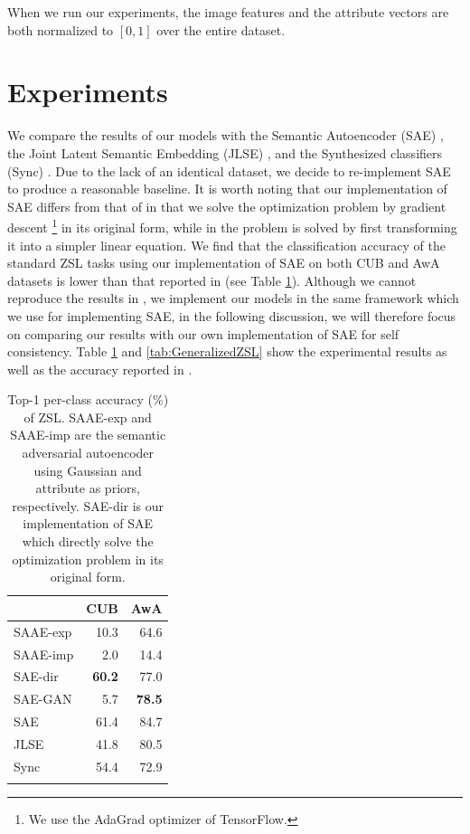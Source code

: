 \documentclass{article}
\begin{document}
When we run our experiments, the image features and the attribute vectors are both normalized to $[0, 1]$ over the entire dataset.




\section{Experiments}

We compare the results of our models with the Semantic Autoencoder (SAE) \cite{kodirov2017semantic}, the Joint Latent Semantic Embedding (JLSE) \cite{zhang2016zero}, and the Synthesized classifiers (Sync) \cite{changpinyo2016synthesized}. Due to the lack of an identical dataset, we decide to re-implement SAE to produce a reasonable baseline. It is worth noting that our implementation of SAE differs from that of \cite{kodirov2017semantic} in that we solve the optimization problem by gradient descent%
\footnote{We use the AdaGrad optimizer of TensorFlow.}%
in its original form, while in \cite{kodirov2017semantic} the problem is solved by first transforming it into a simpler linear equation. We find that the classification accuracy of the standard ZSL tasks using our implementation of SAE on both CUB and AwA datasets is lower than that reported in \cite{kodirov2017semantic} (see Table \ref{tab:StandardZSL}). Although we cannot reproduce the results in \cite{kodirov2017semantic}, we implement our models in the same framework which we use for implementing SAE, in the following discussion, we will therefore focus on comparing our results with our own implementation of SAE for self consistency. Table \ref{tab:StandardZSL} and \ref{tab:GeneralizedZSL} show the experimental results as well as the accuracy reported in \cite{kodirov2017semantic}.



\begin{table}[!htb]
\centering
\begin{tabular}{lrr}
\toprule
 & CUB & AwA \\
\midrule
SAAE-exp & 10.3 & 64.6 \\
SAAE-imp & 2.0 & 14.4 \\
SAE-dir & \bf{60.2} & 77.0 \\
SAE-GAN & 5.7 & \bf{78.5} \\
\midrule
SAE \cite{kodirov2017semantic} & 61.4 & 84.7 \\
JLSE \cite{zhang2016zero} & 41.8 & 80.5 \\
Sync \cite{changpinyo2016synthesized} & 54.4 & 72.9 \\
\bottomrule \\
\end{tabular}
\caption{Top-1 per-class accuracy (\%) of ZSL. SAAE-exp and SAAE-imp are the semantic adversarial autoencoder using Gaussian and attribute as priors, respectively. SAE-dir is our implementation of SAE which directly solve the optimization problem in its original form.}
\label{tab:StandardZSL}
\end{table}
\end{document}

